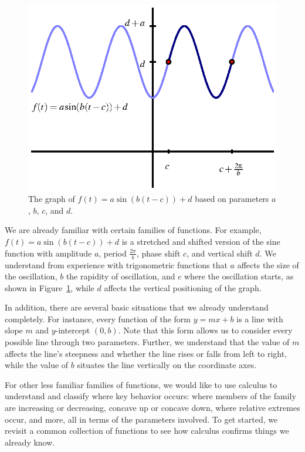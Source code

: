 \begin{figure}[h]
\begin{center}
\includegraphics{figures/3_2_SineFam.eps}
\caption{The graph of $f(t) = a \sin(b(t-c)) + d$ based on parameters $a$, $b$, $c$, and $d$.} \label{F:3.2.SineFam}
\end{center}
\end{figure}

We are already familiar with certain families of functions.  For example, $f(t) = a \sin(b(t-c)) + d$ is a stretched and shifted version of the sine function with amplitude $a$, period $\frac{2\pi}{b}$, phase shift $c$, and vertical shift $d$.  We understand from experience with trigonometric functions that $a$ affects the size of the oscillation, $b$ the rapidity of oscillation, and $c$ where the oscillation starts, as shown in Figure~\ref{F:3.2.SineFam}, while $d$ affects the vertical positioning of the graph.  

In addition, there are several basic situations that we already understand completely.  For instance, every function of the form $y = mx + b$ is a line with slope $m$ and $y$-intercept $(0,b)$.  Note that this form allows us to consider every possible line through two parameters.  Further, we understand that the value of $m$ affects the line's steepness and whether the line rises or falls from left to right, while the value of $b$ situates the line vertically on the coordinate axes.

For other less familiar families of functions, we would like to use calculus to understand and classify where key behavior occurs:  where members of the family are increasing or decreasing, concave up or concave down, where relative extremes occur, and more, all in terms of the parameters involved.  To get started, we revisit a common collection of functions to see how calculus confirms things we already know.

